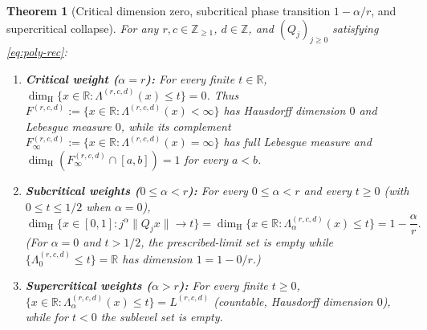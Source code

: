 \documentclass[11pt]{article}
\newtheorem{theorem}{Theorem}
\theoremstyle{definition}
\theoremstyle{remark}
\newcommand{\R}{\mathbb{R}}
\newcommand{\Z}{\mathbb{Z}}
\newcommand{\dimH}{\dim_{\mathrm{H}}}
\newcommand{\Lam}{\Lambda}
\begin{document}
\begin{theorem}[Critical dimension zero, subcritical phase transition $1-\alpha/r$,
and supercritical collapse]\label{thm:poly-phase-transition}
For any $r,c\in\Z_{\ge1}$, $d\in\Z$, and $(Q_j)_{j\ge0}$ satisfying \eqref{eq:poly-rec}:
\begin{enumerate}[label=(\roman*),leftmargin=2em]
\item \textbf{Critical weight ($\alpha=r$):} For every finite $t\in\R$,
$\dimH\{x\in\R:\Lam^{(r,c,d)}(x)\le t\}=0$. Thus
$F^{(r,c,d)}:=\{x\in\R:\Lam^{(r,c,d)}(x)<\infty\}$ has Hausdorff dimension $0$
and Lebesgue measure $0$, while its complement
$F_\infty^{(r,c,d)}:=\{x\in\R:\Lam^{(r,c,d)}(x)=\infty\}$ has full Lebesgue
measure and $\dimH(F_\infty^{(r,c,d)}\cap[a,b])=1$ for every $a<b$.
\item \textbf{Subcritical weights ($0\le\alpha<r$):} For every $0\le\alpha<r$ and
every $t\ge0$ (with $0\le t\le1/2$ when $\alpha=0$),
\[
\dimH\bigl\{x\in[0,1]:j^\alpha\|Q_jx\|\longrightarrow t\bigr\}
=\dimH\bigl\{x\in\R:\Lam_\alpha^{(r,c,d)}(x)\le t\bigr\}
=1-\frac{\alpha}{r}.
\]
(For $\alpha=0$ and $t>1/2$, the prescribed-limit set is empty while
$\{\Lam_0^{(r,c,d)}\le t\}=\R$ has dimension $1=1-0/r$.)
\item \textbf{Supercritical weights ($\alpha>r$):} For every finite $t\ge0$,
$\{x\in\R:\Lam_\alpha^{(r,c,d)}(x)\le t\}=L^{(r,c,d)}$ (countable, Hausdorff
dimension $0$), while for $t<0$ the sublevel set is empty.
\end{enumerate}
\end{theorem}
\end{document}

